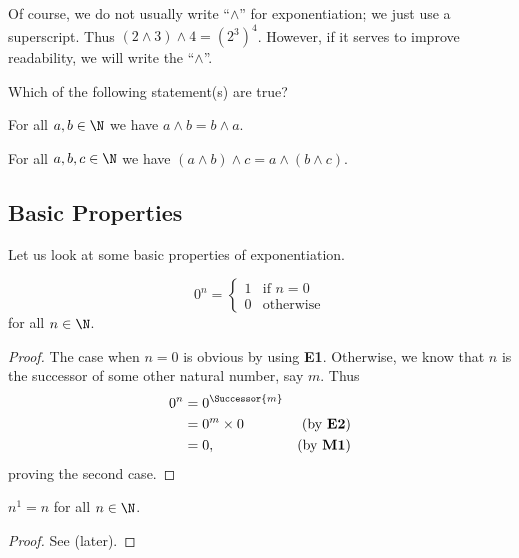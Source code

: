 Of course, we do not usually write ``$\wedge$'' for exponentiation; we just use a superscript. Thus $(2 \wedge 3) \wedge 4 = \left(2^3\right)^4$. However, if it serves to improve readability, we will write the ``$\wedge$''.

\begin{exercise}
    Which of the following statement(s) are true?
    \begin{partquestions}{\alph*}
        \item For all $a, b \in \N$ we have $a \wedge b = b \wedge a$.
        \item For all $a, b, c \in \N$ we have $(a \wedge b) \wedge c = a \wedge (b \wedge c)$.
    \end{partquestions}
\end{exercise}

\subsection{Basic Properties}
Let us look at some basic properties of exponentiation.

\begin{proposition}
    \[
        0^n = \begin{cases}
            1 & \text{if } n = 0\\
            0 & \text{otherwise}
        \end{cases}
    \]
    for all $n \in \N$.
\end{proposition}
\begin{proof}
    The case when $n = 0$ is obvious by using \textbf{E1}. Otherwise, we know that $n$ is the successor of some other natural number, say $m$. Thus
    \begin{align*}
        0^n &= 0^\Successor{m}\\
        &= 0^m \times 0 & (\text{by \textbf{E2}})\\
        &= 0, & (\text{by \textbf{M1}})
    \end{align*}
    proving the second case.
\end{proof}

\begin{proposition}\label{prop:power-of-1}
    $n^1 = n$ for all $n \in \N$.
\end{proposition}
\begin{proof}
    See  (later).
\end{proof}

